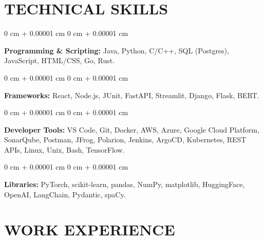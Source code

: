 \documentclass[9pt, letterpaper]{article}
\newenvironment{onecolentry}{
    \begin{adjustwidth}{
        0 cm + 0.00001 cm}{
        0 cm + 0.00001 cm}
}{
    \end{adjustwidth}
} %
\begin{document}
\section{TECHNICAL SKILLS}

    \begin{onecolentry}
    \textbf{Programming \& Scripting:} Java, Python, C/C++, SQL (Postgres), JavaScript, HTML/CSS, Go, Rust.
    \end{onecolentry}

    \begin{onecolentry}
    \textbf{Frameworks:} React, Node.js, JUnit, FastAPI, Streamlit, Django, Flask, BERT.
    \end{onecolentry}

    \begin{onecolentry}
    \textbf{Developer Tools:} VS Code, Git, Docker, AWS, Azure, Google Cloud Platform, SonarQube, Postman, JFrog, Polarion, Jenkins, ArgoCD, Kubernetes, REST APIs, Linux, Unix, Bash, TensorFlow.
    \end{onecolentry}

    \begin{onecolentry}
    \textbf{Libraries:} PyTorch, scikit-learn, pandas, NumPy, matplotlib, HuggingFace, OpenAI, LangChain, Pydantic, spaCy.
    \end{onecolentry}


\section{WORK EXPERIENCE}
\end{document}
